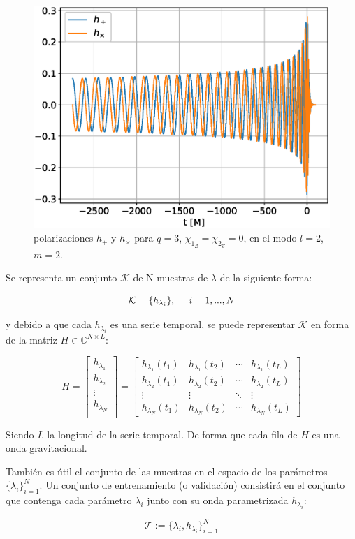 \begin{figure}[h]
\centering
\includegraphics[width=.9\columnwidth]{figs/h_l2m2_q3.eps}
\caption{polarizaciones \(h_+\) y \(h_{\times}\) para $q = 3$, $\chi_{1_Z} = \chi_{2_Z} = 0$, en el modo $l=2$, $m=2$.}
\label{fig:h_q3}
\end{figure}



Se representa un conjunto \( \mathcal{K} \) de N muestras de $\lambda$ de la siguiente forma:

\[ \mathcal{K}  = \{h_{\lambda_i}\}, \hspace{5mm} i = 1, ..., N\]

y debido a que cada $h_{\lambda_i}$ es una serie temporal, se puede representar $\mathcal{K}$ en forma de la matriz $H \in \mathbb{C}^{N\times L}$:

\[
H = 
\begin{bmatrix}
h_{\lambda_1} \\
h_{\lambda_2} \\
 \vdots \\
 h_{\lambda_N} \\
\end{bmatrix}
= 
\begin{bmatrix}
h_{\lambda_1}(t_1) & h_{\lambda_1}(t_2)  & \cdots & h_{\lambda_1}(t_L)\\
 h_{\lambda_2}(t_1) & h_{\lambda_2}(t_2)  & \cdots & h_{\lambda_2}(t_L)\\
 \vdots & \vdots & \ddots &  \vdots \\
h_{\lambda_N}(t_1) & h_{\lambda_N}(t_2)  & \cdots & h_{\lambda_N}(t_L)
\end{bmatrix}
\]

Siendo $L$ la longitud de la serie temporal. De forma que cada fila de $H$ es una onda gravitacional.

También es útil el conjunto de las muestras en el espacio de los parámetros
$\{ \lambda_i \}_{i=1}^N$. 
Un conjunto de entrenamiento (o validación) consistirá en el conjunto que contenga cada parámetro $\lambda_i$ junto con su onda parametrizada $h_{\lambda_i}$:

\[
\mathcal{T} := \{ \lambda_i, h_{\lambda_i} \}_{i=1}^N
\]



